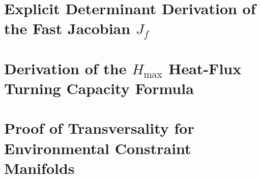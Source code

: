 \documentclass[11pt,letterpaper]{article}
\begin{document}
\section{Explicit Determinant Derivation of the Fast Jacobian $J_f$}
\label{app:jacobian}

\section{Derivation of the $H_{\max}$ Heat-Flux Turning Capacity Formula}
\label{app:hmax}

\section{Proof of Transversality for Environmental Constraint Manifolds}
\label{app:transversality}

\clearpage

\nocite{*}




\end{document}
